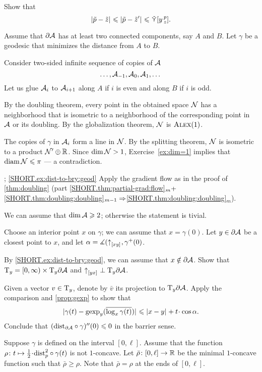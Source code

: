 Show that 
\[|{\tilde p}-{\tilde z}|_{}^{{}}\leqslant |{\tilde p}-{\tilde z'}|_{}^{{}}\leqslant\mathop{\tilde\curlyvee}\nolimits[y\,{}^{p}_{z}].\]


Assume that $\partial\mathcal{A}$ has at least two connected components, say $A$ and $B$.
Let $\gamma$ be a geodesic that minimizes the distance from $A$ to $B$.

Consider two-sided infinite sequence of copies of $\mathcal{A}$
\[\dots,\mathcal{A}_{-1},\mathcal{A}_{0},\mathcal{A}_{1},\dots\]
Let us glue $\mathcal{A}_{i}$ to $\mathcal{A}_{i+1}$ along $A$ if $i$ is even and along $B$ if $i$ is odd.

By the doubling theorem, every point in the obtained space $\mathcal{N}$ has a neighborhood that is isometric to a neighborhood of the corresponding point in $\mathcal{A}$ or its doubling.
By the globalization theorem, $\mathcal{N}$ is $\textsc{Alex}(1)$.

The copies of $\gamma$ in $\mathcal{A}_{i}$ form a line in $\mathcal{N}$.
By the splitting theorem, $\mathcal{N}$ is isometric to a product $\mathcal{N}'\oplus \mathbb{R}$.
Since $\operatorname{\rm dim}\nolimits\mathcal{N}>1$, Exercise~\ref{ex:dim=1} implies that $\operatorname{\rm diam}\nolimits\mathcal{N}\leqslant \pi$ --- a contradiction.

\parbf{\ref{ex:dist-to-bry}}; \ref{SHORT.ex:dist-to-bry:geod}
Apply the gradient flow as in the proof of \ref{thm:doubling} (part \ref{SHORT.thm:partial-grad:flow}$_{m}+$\ref{SHORT.thm:doubling:doubling}$_{m-1}\Rightarrow$\ref{SHORT.thm:doubling:doubling}$_m$).

We can assume that $\operatorname{\rm dim}\nolimits \mathcal{A}\geqslant 2$; otherwise the statement is tivial.

Choose an interior point $x$ on $\gamma$;
we can assume that $x=\gamma(0)$.
Let $y\in \partial \mathcal{A}$ be a closest point to $x$,
and let $\alpha=\measuredangle({\uparrow}_{[{x}{y}]_{{}}},\gamma^+(0)$.

By \ref{SHORT.ex:dist-to-bry:geod}, we can assume that $x\notin \partial \mathcal{A}$.
Show that $\mathrm{T}_y=[0,\infty)\times\mathrm{T}_y\partial \mathcal{A}$
and ${\uparrow}_{[{y}{x}]_{{}}}\perp \mathrm{T}_y\partial \mathcal{A}$.

Given a vector $v\in \mathrm{T}_y$, denote by $\bar v$ its projection to $\mathrm{T}_y\partial \mathcal{A}$.
Apply the comparison and \ref{prop:gexp} to show that 
\[\dist{\gamma(t)}{\gexp_y(\overline{\log_x\gamma(t)})}{}\le \dist{x}{y}{}+t\cdot\cos\alpha.\]
Conclude that $(\mathrm{dist}_{\partial \mathcal{A}}\circ\gamma)''(0)\leqslant 0$ in the barrier sense.


Suppose $\gamma$ is defined on the interval $[0,\ell]$.
Assume that the function $\rho\:t\mapsto \tfrac12\cdot\distfun_p^2\circ\gamma(t)$ is not $1$-concave.
Let $\bar\rho\colon[0,\ell]\to\mathbb{R}$ be the minimal $1$-concave function such that $\bar\rho\ge \rho$.
Note that $\bar\rho=\rho$ at the ends of $[0,\ell]$.

